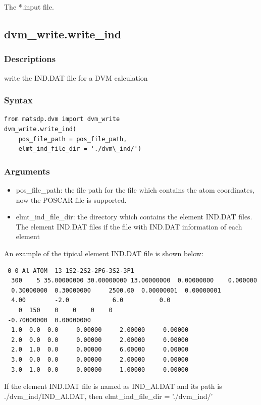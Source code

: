 \documentclass[12pt]{book}
\begin{document}
The *.input file.

\subsection{dvm\_write.write\_ind}
\subsubsection{Descriptions}
write the IND.DAT file for a DVM calculation

\subsubsection{Syntax}
\begin{lstlisting}
from matsdp.dvm import dvm_write
dvm_write.write_ind(
    pos_file_path = pos_file_path, 
    elmt_ind_file_dir = './dvm\_ind/')
\end{lstlisting}

\subsubsection{Arguments}

\begin{itemize}
\item pos\_file\_path: the file path for the file which contains the atom coordinates, now the POSCAR file is supported.
\item elmt\_ind\_file\_dir: the directory which contains the element IND.DAT files. The element IND.DAT files if the file with IND.DAT information of each element
\end{itemize}


An example of the tipical element IND.DAT file is shown below:

\begin{lstlisting}
 0 0 Al ATOM  13 1S2-2S2-2P6-3S2-3P1
  300    5 35.00000000 30.00000000 13.00000000  0.00000000    0.000000
  0.30000000  0.30000000     2500.00  0.00000001  0.00000001
  4.00        -2.0            6.0          0.0
    0  150    0    0    0    0
 -0.70000000  0.00000000
  1.0  0.0  0.0     0.00000     2.00000     0.00000
  2.0  0.0  0.0     0.00000     2.00000     0.00000
  2.0  1.0  0.0     0.00000     6.00000     0.00000
  3.0  0.0  0.0     0.00000     2.00000     0.00000
  3.0  1.0  0.0     0.00000     1.00000     0.00000
\end{lstlisting}

If the element IND.DAT file is named as IND\_Al.DAT and its path is ./dvm\_ind/IND\_Al.DAT, then elmt\_ind\_file\_dir = './dvm\_ind/'
\end{document}

